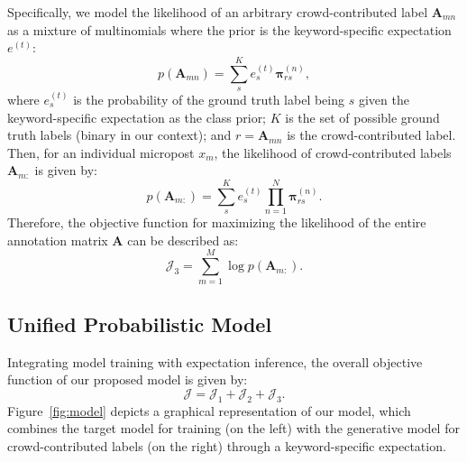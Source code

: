 \documentclass[letterpaper]{article}
\begin{document}
Specifically, we model the likelihood of an arbitrary crowd-contributed label $\mathbf{A}_{mn}$ as a mixture of multinomials where the prior is the keyword-specific expectation $e^{(t)}$:
\begin{equation}
    p(\mathbf{A}_{mn}) = \sum_s^K e_s^{(t)} \boldsymbol{\pi}_{rs}^{(n)}, %
\end{equation}
where $e_s^{(t)}$ is the probability of the ground truth label being $s$ given the keyword-specific expectation as the class prior; $K$ is the set of possible ground truth labels (binary in our context); and $r=\mathbf{A}_{mn}$ is the crowd-contributed label. Then, for an individual micropost $x_m$, the likelihood of crowd-contributed labels $\mathbf{A}_{m:}$ is given by:
\begin{equation}
    p(\mathbf{A}_{m:}) = \sum_s^K e_s^{(t)} \prod_{n=1}^N \boldsymbol{\pi}_{rs}^{(n)}.
\end{equation}
Therefore, the objective function for maximizing the likelihood of the entire annotation matrix $\mathbf{A}$ can be described as:
\begin{equation}
    \mathcal{J}_3  = \sum_{m=1}^M \log p(\mathbf{A}_{m:}).
\end{equation}


\subsection{Unified Probabilistic Model}
\label{upl}
Integrating model training with expectation inference, the overall objective function of our proposed model is given by:
\begin{equation}
    \mathcal{J} = \mathcal{J}_1 + \mathcal{J}_2 + \mathcal{J}_3.
\end{equation}
Figure~\ref{fig:model} depicts a graphical representation of our model, which combines the target model for training (on the left) with the generative model for crowd-contributed labels (on the right) through a keyword-specific expectation.
\end{document}
